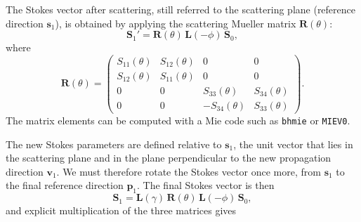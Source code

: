 \documentclass[english,a4paper]{kiseon_memo}
\begin{document}
The Stokes vector after scattering, still referred to the
scattering plane (reference direction $\mathbf{s}_{1}$), is
obtained by applying the scattering Mueller matrix
$\mathbf{R}(\theta)$:
\[
\mathbf{S}_{1}'=\mathbf{R}(\theta)\,\mathbf{L}(-\phi)\,\mathbf{S}_{0},
\]
where
\[
\mathbf{R}(\theta)=\left(\begin{array}{cccc}
S_{11}(\theta) & S_{12}(\theta) & 0 & 0\\
S_{12}(\theta) & S_{11}(\theta) & 0 & 0\\
0 & 0 & S_{33}(\theta) & S_{34}(\theta)\\
0 & 0 & -S_{34}(\theta) & S_{33}(\theta)
\end{array}\right).
\]
The matrix elements can be computed with a Mie code such as
\texttt{bhmie} or \texttt{MIEV0}.

The new Stokes parameters are defined relative to $\mathbf{s}_{1}$,
the unit vector that lies in the scattering plane and in the plane
perpendicular to the new propagation direction $\mathbf{v}_{1}$.
We must therefore rotate the Stokes vector once more, from
$\mathbf{s}_{1}$ to the final reference direction
$\mathbf{p}_{1}$. The final Stokes vector is then
\[
\mathbf{S}_{1}=\mathbf{L}(\gamma)\,\mathbf{R}(\theta)\,\mathbf{L}(-\phi)\,\mathbf{S}_{0},
\]
and explicit multiplication of the three matrices gives
\end{document}
